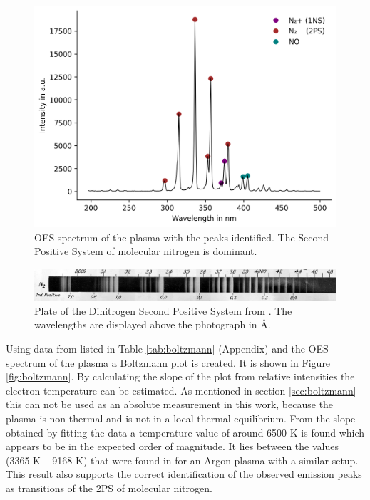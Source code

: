 \begin{figure}
    \centering
    \includegraphics[width=1\textwidth]{images/OES_analysis.png}
    \caption[OES spectrum with identification]{OES spectrum of the plasma with the peaks identified. The Second Positive System of molecular nitrogen is dominant.}
    \label{fig:oes_analysis}
\end{figure}

\begin{figure}
    \centering
    \includegraphics[width=1\textwidth]{images/N2_2PS.jpeg}
    \caption[Dinitrogen Second Positive System from literature]{Plate of the Dinitrogen Second Positive System from \cite{book}. The wavelengths are displayed above the photograph in Å.}
    \label{fig:n2_2ps}
\end{figure}


Using data from \cite{coefficients} listed in Table \ref{tab:boltzmann} (Appendix) and the OES spectrum of the plasma a Boltzmann plot is created. It is shown in Figure \ref{fig:boltzmann}. By calculating the slope of the plot from relative intensities the electron temperature can be estimated. As mentioned in section \ref{sec:boltzmann} this can not be used as an absolute measurement in this work, because the plasma is non-thermal and is not in a local thermal equilibrium. From the slope obtained by fitting the data a temperature value of around 6500 K is found which appears to be in the expected order of magnitude. It lies between the values (3365 K -- 9168 K) that were found in \cite{oes_temperature} for an Argon plasma with a similar setup. This result also supports the correct identification of the observed emission peaks as transitions of the 2PS of molecular nitrogen.

